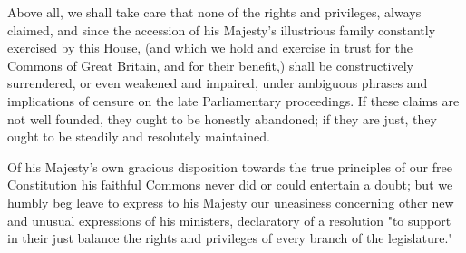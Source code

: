  Above all, we shall take care that none of the rights and privileges, always claimed, and since the accession of his Majesty's illustrious family constantly exercised by this House, (and which we hold and exercise in trust for the Commons of Great Britain, and for their benefit,) shall be constructively surrendered, or even weakened and impaired, under ambiguous phrases and implications of censure on the late Parliamentary proceedings. If these claims are not well founded, they ought to be honestly abandoned; if they are just, they ought to be steadily and resolutely maintained.

Of his Majesty's own gracious disposition towards the true principles of our free Constitution his faithful Commons never did or could entertain a doubt; but we humbly beg leave to express to his Majesty our uneasiness concerning other new and unusual expressions of his ministers, declaratory of a resolution "to support in their just balance the rights and privileges of every branch of the legislature."

